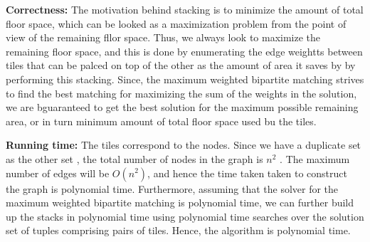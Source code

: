 \documentclass{article}
\newcommand\correctness{\vspace{.10in}\textbf{Correctness: }}
\newcommand\runtime{\vspace{.10in}\textbf{Running time: }}
\begin{document}
  \correctness The motivation behind stacking is to minimize the amount of total floor space, which can be looked as a maximization problem from the point of view of the remaining fllor space. Thus, we always look to maximize the remaining floor space, and this is done by enumerating the edge weightts between tiles that can be palced on top of the other as the amount of area it saves by by performing this stacking. Since, the maximum weighted bipartite matching strives to find the best matching for maximizing the sum of the weights in the solution, we are bguaranteed to get the best solution for the maximum possible remaining area, or in turn minimum amount of total floor space used bu the tiles. \newline

  \runtime The tiles correspond to the nodes. Since we have a duplicate set as the other set , the total number of nodes in the graph is $n^2$ . The maximum number of edges will be $O(n^2)$, and hence the time taken taken to construct the graph is polynomial time. Furthermore, assuming that the solver for the maximum weighted bipartite matching is polynomial time, we can further build up the stacks in polynomial time using polynomial time searches over the solution set of tuples comprising pairs of tiles. Hence, the algorithm is polynomial time. \newline
   
 
\end{document}
